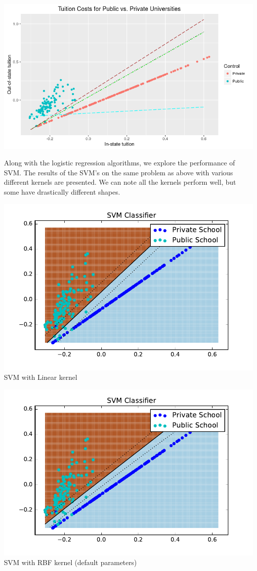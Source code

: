 \documentclass[10pt]{article}
\begin{document}
\includegraphics[width=\textwidth]{figures/tuition-all}

Along with the logistic regression algorithms, we explore the performance of SVM. The results of the SVM's on the same problem as above with various different kernels are presented. We can note all the kernels perform well, but some have drastically different shapes.

\includegraphics[width=\textwidth]{figures/svm_1}
SVM with Linear kernel

\includegraphics[width=\textwidth]{figures/svm_2}
SVM with RBF kernel (default parameters)
\end{document}
